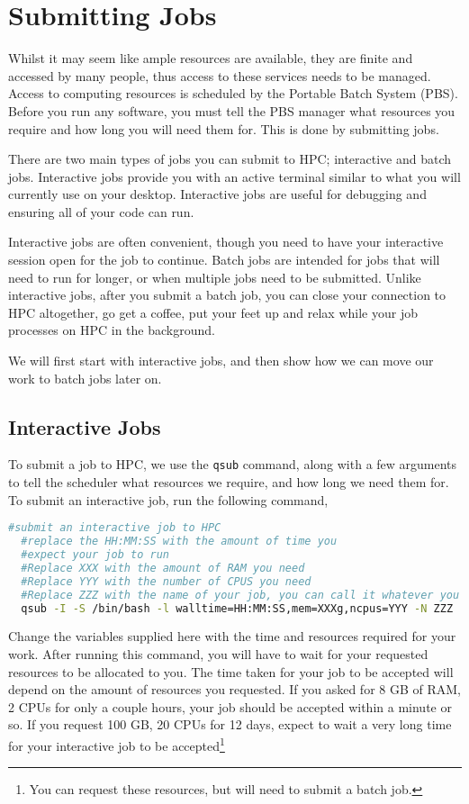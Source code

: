 \section{Submitting Jobs}
% 
% 
%
Whilst it may seem like ample resources are available, they are finite and accessed by many people, thus access to these services needs to be managed. Access to computing resources is scheduled by the Portable Batch System (PBS). Before you run any software, you must tell the PBS manager what resources you require and how long you will need them for. This is done by submitting jobs.
%
%
\par
%
%
There are two main types of jobs you can submit to HPC; interactive and batch jobs. Interactive jobs provide you with an active terminal similar to what you will currently use on your desktop. Interactive jobs are useful for debugging and ensuring all of your code can run.
%
%
\par
%
%
Interactive jobs are often convenient, though you need to have your interactive session open for the job to continue. Batch jobs are intended for jobs that will need to run for longer, or when multiple jobs need to be submitted. Unlike interactive jobs, after you submit a batch job, you can close your connection to HPC altogether, go get a coffee, put your feet up and relax while your job processes on HPC in the background.
%
%
%
\par
We will first start with interactive jobs, and then show how we can move our work to batch jobs later on.
%
%
%
\subsection{Interactive Jobs}
To submit a job to HPC, we use the \texttt{qsub} command, along with a few arguments to tell the scheduler what resources we require, and how long we need them for. To submit an interactive job, run the following command,
\begin{lstlisting}[language=bash, frame=single]
  #submit an interactive job to HPC
  #replace the HH:MM:SS with the amount of time you
  #expect your job to run
  #Replace XXX with the amount of RAM you need
  #Replace YYY with the number of CPUS you need
  #Replace ZZZ with the name of your job, you can call it whatever you like :)
  qsub -I -S /bin/bash -l walltime=HH:MM:SS,mem=XXXg,ncpus=YYY -N ZZZ
\end{lstlisting}
%
%
Change the variables supplied here with the time and resources required for your work. After running this command, you will have to wait for your requested resources to be allocated to you. The time taken for your job to be accepted will depend on the amount of resources you requested. If you asked for 8 GB of RAM, 2 CPUs for only a couple hours, your job should be accepted within a minute or so. If you request 100 GB, 20 CPUs for 12 days, expect to wait a very long time for your interactive job to be accepted\footnote{You can request these resources, but will need to submit a batch job.}


